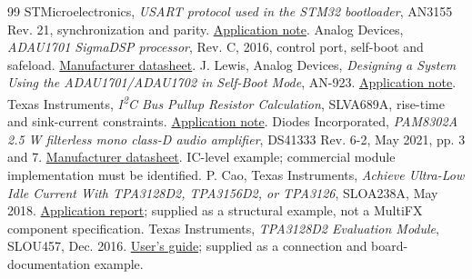 \documentclass[a4paper,10pt]{article}
\begin{document}
\begin{thebibliography}{99}
 STMicroelectronics, \emph{USART protocol used in the STM32 bootloader}, AN3155 Rev. 21, synchronization and parity. \href{https://www.st.com/resource/en/application_note/an3155-how-to-use-usart-protocol-in-bootloader-on-stm32-mcus-stmicroelectronics.pdf}{Application note}.
 Analog Devices, \emph{ADAU1701 SigmaDSP processor}, Rev. C, 2016, control port, self-boot and safeload. \href{https://www.analog.com/media/en/technical-documentation/data-sheets/ADAU1701.pdf}{Manufacturer datasheet}.
 J. Lewis, Analog Devices, \emph{Designing a System Using the ADAU1701/ADAU1702 in Self-Boot Mode}, AN-923. \href{https://www.analog.com/en/resources/app-notes/an-923.html}{Application note}.
 Texas Instruments, \emph{I\textsuperscript{2}C Bus Pullup Resistor Calculation}, SLVA689A, rise-time and sink-current constraints. \href{https://www.ti.com/lit/pdf/slva689}{Application note}.
 Diodes Incorporated, \emph{PAM8302A 2.5 W filterless mono class-D audio amplifier}, DS41333 Rev. 6-2, May 2021, pp. 3 and 7. \href{https://www.diodes.com/datasheet/download/PAM8302A.pdf}{Manufacturer datasheet}. IC-level example; commercial module implementation must be identified.
 P. Cao, Texas Instruments, \emph{Achieve Ultra-Low Idle Current With TPA3128D2, TPA3156D2, or TPA3126}, SLOA238A, May 2018. \href{https://www.ti.com/lit/pdf/sloa238}{Application report}; supplied as a structural example, not a MultiFX component specification.
 Texas Instruments, \emph{TPA3128D2 Evaluation Module}, SLOU457, Dec. 2016. \href{https://www.ti.com/lit/pdf/slou457}{User's guide}; supplied as a connection and board-documentation example.
\end{thebibliography}
\endgroup
\end{document}
